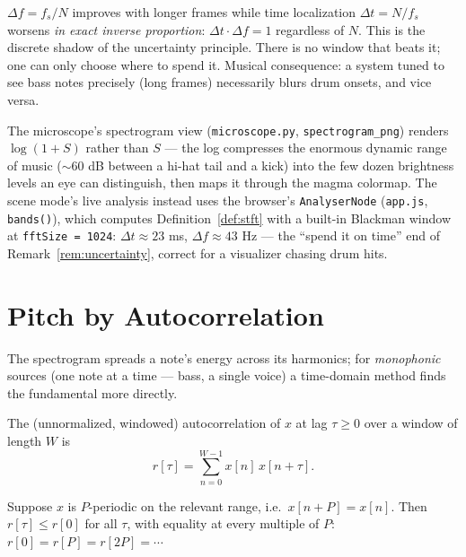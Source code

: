 \begin{remark}\label{rem:uncertainty}
$\Delta f = f_s / N$ improves with longer frames while time localization
$\Delta t = N / f_s$ worsens \emph{in exact inverse proportion}:
$\Delta t \cdot \Delta f = 1$ regardless of $N$. This is the discrete shadow
of the uncertainty principle. There is no window that beats it; one can only
choose where to spend it. Musical consequence: a system tuned to see bass
notes precisely (long frames) necessarily blurs drum onsets, and vice versa.
\end{remark}

\begin{incode}
The microscope's spectrogram view (\texttt{microscope.py},
\texttt{spectrogram\_png}) renders $\log(1 + S)$ rather than $S$ --- the log
compresses the enormous dynamic range of music ($\sim$60 dB between a hi-hat
tail and a kick) into the few dozen brightness levels an eye can
distinguish, then maps it through the magma colormap. The scene mode's live
analysis instead uses the browser's \texttt{AnalyserNode}
(\texttt{app.js}, \texttt{bands()}), which computes
Definition~\ref{def:stft} with a built-in Blackman window at
\texttt{fftSize = 1024}: $\Delta t \approx 23$ ms, $\Delta f \approx 43$ Hz
--- the ``spend it on time'' end of Remark~\ref{rem:uncertainty}, correct for
a visualizer chasing drum hits.
\end{incode}

\section{Pitch by Autocorrelation}

The spectrogram spreads a note's energy across its harmonics; for
\emph{monophonic} sources (one note at a time --- bass, a single voice) a
time-domain method finds the fundamental more directly.

\begin{definition}[Autocorrelation]\label{def:acf}
The (unnormalized, windowed) autocorrelation of $x$ at lag $\tau \ge 0$ over
a window of length $W$ is
\[
r[\tau] = \sum_{n=0}^{W-1} x[n]\, x[n + \tau].
\]
\end{definition}

\begin{proposition}\label{prop:acfpeak}
Suppose $x$ is $P$-periodic on the relevant range, i.e.\ $x[n + P] = x[n]$.
Then $r[\tau] \le r[0]$ for all $\tau$, with equality at every multiple of
$P$: $r[0] = r[P] = r[2P] = \cdots$
\end{proposition}

